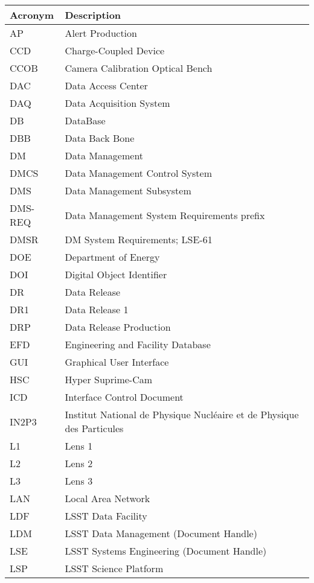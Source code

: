\addtocounter{table}{-1}
\begin{longtable}{p{}p{}}\hline
\textbf{Acronym} & \textbf{Description}  \\\hline

AP & Alert Production \\\hline
CCD & Charge-Coupled Device \\\hline
CCOB & Camera Calibration Optical Bench \\\hline
DAC & Data Access Center \\\hline
DAQ & Data Acquisition System \\\hline
DB & DataBase \\\hline
DBB & Data Back Bone \\\hline
DM & Data Management \\\hline
DMCS & Data Management Control System \\\hline
DMS & Data Management Subsystem \\\hline
DMS-REQ & Data Management System Requirements prefix \\\hline
DMSR & DM System Requirements; LSE-61 \\\hline
DOE & Department of Energy \\\hline
DOI & Digital Object Identifier \\\hline
DR & Data Release \\\hline
DR1 & Data Release 1 \\\hline
DRP & Data Release Production \\\hline
EFD & Engineering and Facility Database \\\hline
GUI & Graphical User Interface \\\hline
HSC & Hyper Suprime-Cam \\\hline
ICD & Interface Control Document \\\hline
IN2P3 & Institut National de Physique Nucléaire et de Physique des Particules \\\hline
L1 & Lens 1 \\\hline
L2 & Lens 2 \\\hline
L3 & Lens 3 \\\hline
LAN & Local Area Network \\\hline
LDF & LSST Data Facility \\\hline
LDM & LSST Data Management (Document Handle) \\\hline
LSE & LSST Systems Engineering (Document Handle) \\\hline
LSP & LSST Science Platform \\\hline

\end{longtable}
